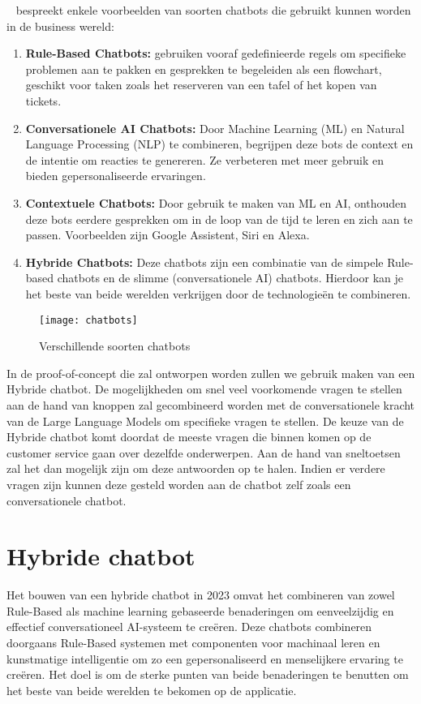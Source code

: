 ~\textcite{Patel2024} bespreekt enkele voorbeelden van soorten chatbots die gebruikt kunnen worden in de business wereld: 
\begin{enumerate}
    \item \textbf{Rule-Based Chatbots:} gebruiken vooraf gedefinieerde regels om specifieke problemen aan te pakken en gesprekken te begeleiden als een flowchart, geschikt voor taken zoals het reserveren van een tafel of het kopen van tickets.
    
    \item \textbf{Conversationele AI Chatbots:} Door Machine Learning (ML) en Natural Language Processing (NLP) te combineren, begrijpen deze bots de context en de intentie om reacties te genereren. Ze verbeteren met meer gebruik en bieden gepersonaliseerde ervaringen.
    
    \item \textbf{Contextuele Chatbots:} Door gebruik te maken van ML en AI, onthouden deze bots eerdere gesprekken om in de loop van de tijd te leren en zich aan te passen. Voorbeelden zijn Google Assistent, Siri en Alexa.
    
    \item \textbf{Hybride Chatbots:} Deze chatbots zijn een combinatie van de simpele Rule-based chatbots en de slimme (conversationele AI) chatbots. Hierdoor kan je het beste van beide werelden verkrijgen door de technologieën te combineren.  
\end{enumerate}


\begin{figure}
    \centering
    \texttt{[image: chatbots]}
    \caption{Verschillende soorten chatbots}
    \label{fig:chatbots}
\end{figure}


In de proof-of-concept die zal ontworpen worden zullen we gebruik maken van een Hybride chatbot. De mogelijkheden om snel veel voorkomende vragen te stellen aan de hand van knoppen zal gecombineerd worden met de conversationele kracht van de Large Language Models om specifieke vragen te stellen. De keuze van de Hybride chatbot komt doordat de meeste vragen die binnen komen op de customer service gaan over dezelfde onderwerpen. Aan de hand van sneltoetsen zal het dan mogelijk zijn om deze antwoorden op te halen. Indien er verdere vragen zijn kunnen deze gesteld worden aan de chatbot zelf zoals een conversationele chatbot. 

\section{Hybride chatbot}
Het bouwen van een hybride chatbot in 2023 omvat het combineren van zowel Rule-Based als machine learning gebaseerde benaderingen om een ​​veelzijdig en effectief conversationeel AI-systeem te creëren. Deze chatbots combineren doorgaans Rule-Based systemen met componenten voor machinaal leren en kunstmatige intelligentie om zo een gepersonaliseerd en menselijkere ervaring te creëren. Het doel is om de sterke punten van beide benaderingen te benutten om het beste van beide werelden te bekomen op de applicatie. 

